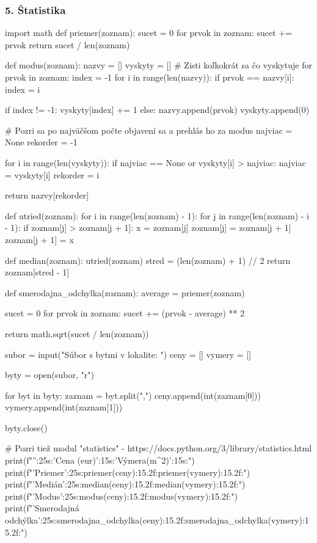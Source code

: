 \subsubsection*{5. Štatistika}
\begin{solution}
import math
def priemer(zoznam):
    sucet = 0
    for prvok in zoznam:
        sucet += prvok
    return sucet / len(zoznam)

def modus(zoznam):
    nazvy = []
    vyskyty = []
    # Zisti koľkokrát sa čo vyskytuje
    for prvok in zoznam:
        index = -1
        for i in range(len(nazvy)):
            if prvok == nazvy[i]:
                index = i

        if index != -1:
            vyskyty[index] += 1
        else:
            nazvy.append(prvok)
            vyskyty.append(0)

    # Pozri sa po najväčšom počte objavení sa a prehlás ho za modus
    najviac = None
    rekorder = -1

    for i in range(len(vyskyty)):
        if najviac == None or vyskyty[i] > najviac:
            najviac = vyskyty[i]
            rekorder = i

    return nazvy[rekorder]

def utried(zoznam):
    for i in range(len(zoznam) - 1):
        for j in range(len(zoznam) - i - 1):
            if zoznam[j] > zoznam[j + 1]:
                x = zoznam[j]
                zoznam[j] = zoznam[j + 1]
                zoznam[j + 1] = x

def median(zoznam):
    utried(zoznam)
    stred = (len(zoznam) + 1) // 2
    return zoznam[stred - 1]

def smerodajna_odchylka(zoznam):
    average = priemer(zoznam)

    sucet = 0
    for prvok in zoznam:
        sucet += (prvok - average) ** 2

    return math.sqrt(sucet / len(zoznam))

subor = input("Súbor s bytmi v lokalite: ")
ceny = []
vymery = []

byty = open(subor, "r")

for byt in byty:
    zaznam = byt.split(",")
    ceny.append(int(zaznam[0]))
    vymery.append(int(zaznam[1]))

byty.close()

# Pozri tiež modul "statistics" - https://docs.python.org/3/library/statistics.html
print(f"{'':25s}:{'Cena (eur)':15s}:{'Výmera(m^2)':15s}:")
print(f"{'Priemer':25s}:{priemer(ceny):15.2f}:{priemer(vymery):15.2f}:")
print(f"{'Medián':25s}:{median(ceny):15.2f}:{median(vymery):15.2f}:")
print(f"{'Modus':25s}:{modus(ceny):15.2f}:{modus(vymery):15.2f}:")
print(f"{'Smerodajná odchýlka':25s}:{smerodajna_odchylka(ceny):15.2f}:{smerodajna_odchylka(vymery):15.2f}:")
\end{solution}

